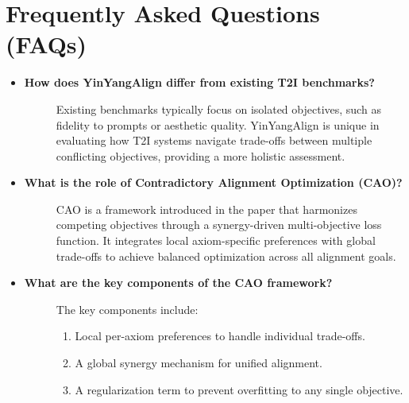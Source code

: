 


\onecolumn

\section{Frequently Asked Questions (FAQs)}
\label{sec:FAQs}

\begin{itemize}[leftmargin=15pt,nolistsep]


\item[\ding{93}] { \selectfont \textbf{How does YinYangAlign differ from existing T2I benchmarks?}}
\vspace{0mm}
\begin{description}
\item[] Existing benchmarks typically focus on isolated objectives, such as fidelity to prompts or aesthetic quality. YinYangAlign is unique in evaluating how T2I systems navigate trade-offs between multiple conflicting objectives, providing a more holistic assessment.
\end{description}

\item[\ding{93}] { \selectfont \textbf{What is the role of Contradictory Alignment Optimization (CAO)?}}
\vspace{0mm}
\begin{description}
\item[] CAO is a framework introduced in the paper that harmonizes competing objectives through a synergy-driven multi-objective loss function. It integrates local axiom-specific preferences with global trade-offs to achieve balanced optimization across all alignment goals.
\end{description}

\item[\ding{93}] { \selectfont \textbf{What are the key components of the CAO framework?}}
\vspace{0mm}
\begin{description}
\item[] The key components include:
\begin{enumerate}
    \item Local per-axiom preferences to handle individual trade-offs.
    \item A global synergy mechanism for unified alignment.
    \item A regularization term to prevent overfitting to any single objective.
\end{enumerate}
\end{description}


\end{itemize}
